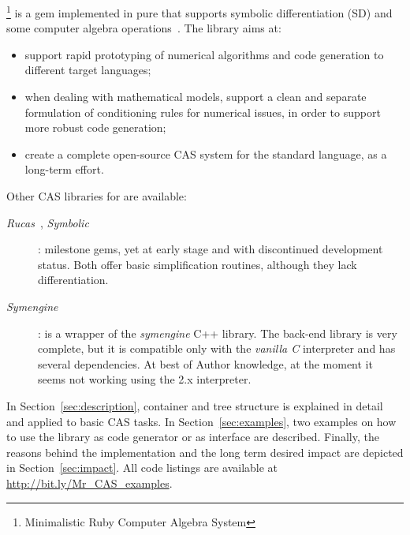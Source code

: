\ragnicas\footnote{Minimalistic Ruby Computer Algebra System} is a gem implemented in pure \Ruby that supports symbolic differentiation (SD) and some computer algebra operations~\cite{von2013modern}. The library aims at:
\begin{itemize}
  \item support rapid prototyping of numerical algorithms and code generation to different target languages;
  \item when dealing with mathematical models, support a clean and separate formulation of conditioning rules for numerical issues, in order to support more robust code generation;
  \item create a complete open-source CAS system for the standard \Ruby language, as a long-term effort.
\end{itemize}

Other CAS libraries for \Ruby are available:
\begin{description}
  \item [\emph{Rucas}~\cite{rucas}, \emph{Symbolic}~\cite{symbolic}]: milestone gems, yet at early stage and with discontinued development status. Both offer basic simplification routines, although they lack differentiation.
  \item [\emph{Symengine}~\cite{symengine}]: is a wrapper of the \emph{symengine} C++ library. The back-end library is very complete, but it is compatible only with the \emph{vanilla C} \Ruby interpreter and has several dependencies.
  At best of Author knowledge, at the moment it seems not working using the \Ruby 2.x interpreter.
\end{description}

In Section~\ref{sec:description}, \ragnicas container and tree structure is explained in detail and applied to basic CAS tasks. In Section~\ref{sec:examples}, two examples on how to use the library as code generator or as interface are described. Finally, the reasons behind the implementation and the long term desired impact are depicted in Section~\ref{sec:impact}. All code listings are available at \url{http://bit.ly/Mr_CAS_examples}.
